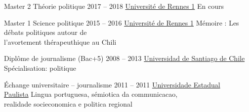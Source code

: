 


%
%








\begin{coordinatelist}
\end{coordinatelist}









%
%




\begin{yearlist}

\item[Master 2 Théorie politique]{2017 -- 2018}
     {\href{https://formations.univ-rennes1.fr/formations/master-2-theorie-politique}{Université de Rennes 1}}
     {En cours}
     

\item[Master 1 Science politique]{2015 -- 2016}
     {\href{https://formations.univ-rennes1.fr/formations/master-1-science-politique}{Université de Rennes 1}}
     {Mémoire : Les débats politiques autour de \\ l'avortement
     thérapeuthique au Chili}


\item[Diplôme de journalisme (Bac+5)]{2008 -- 2013}
     {\href{http://periodismo.usach.cl/} {Universidad de Santiago de Chile}}
     {Spécialisation: politique}


\item[Échange universitaire -- journalisme]{2011 -- 2011}
     {\href{http://www.unesp.br/} {Universidade Estadual \\ Paulista}}
     {Lingua portuguesa, sémiotica da communicacao,\\ 
     realidade socieconomica e politica regional }


\end{yearlist}





